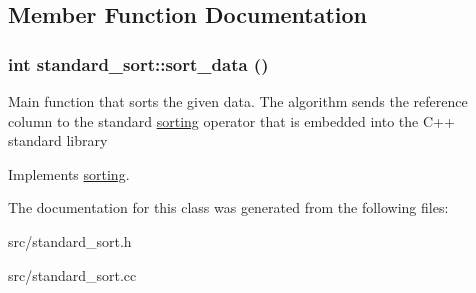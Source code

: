 \subsection{Member Function Documentation}
\hypertarget{classstandard__sort_a34a0d914ebac6e328dfe371a1e1a8afb}{
\subsubsection[{sort\_\-data}]{\setlength{\rightskip}{0pt plus 5cm}int standard\_\-sort::sort\_\-data ()}}
\label{d4/dec/classstandard__sort_a34a0d914ebac6e328dfe371a1e1a8afb}


Main function that sorts the given data. The algorithm sends the reference column to the standard \hyperlink{classsorting}{sorting} operator that is embedded into the C++ standard library 

Implements \hyperlink{classsorting_a94c4b729732743299f3dcd2505312381}{sorting}.

The documentation for this class was generated from the following files:\begin{DoxyCompactItemize}
\item 
src/standard\_\-sort.h\item 
src/standard\_\-sort.cc\end{DoxyCompactItemize}
